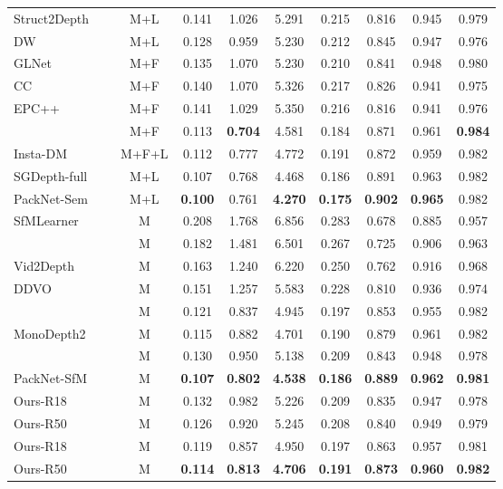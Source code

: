 \documentclass[twocolumn]{svjour3}
\renewcommand{\cite}[1]{\textcolor{blue}{\citep{#1}}}
\begin{document}
\begin{table*}[t]
\begin{tabular}{l c c| c c c c | c c c}
     Struct2Depth~\cite{casser2019struct2depth} &  & M+L & 0.141 & 1.026 & 5.291 & 0.215 & 0.816 & 0.945 & 0.979 \\
     DW\cite{gordon2019depth} &  & M+L & 0.128 & 0.959 & 5.230 & 0.212 & 0.845 & 0.947 & 0.976 \\
     GLNet\cite{chen2019self} &  & M+F & 0.135 & 1.070 & 5.230 & 0.210 & 0.841 & 0.948 & 0.980 \\
     CC~\cite{ranjan2019cc} &  & M+F & 0.140 & 1.070 & 5.326  & 0.217 & 0.826 & 0.941 & 0.975 \\
     EPC++~\cite{luo2019every} &  &M+F & 0.141 & 1.029 & 5.350 & 0.216 & 0.816 & 0.941 & 0.976 \\
     \cite{zhao2020towards} &  &M+F & 0.113 & \textbf{0.704} & 4.581 & 0.184 & 0.871 & 0.961 & \textbf{0.984} \\
     Insta-DM~\cite{lee2021learning} &  & M+F+L & 0.112	& 0.777	& 4.772	& 0.191	& 0.872	& 0.959	& 0.982 \\
     SGDepth-full~\cite{klingner2020self} &  & M+L & 0.107 & 0.768 & 4.468 & 0.186 & 0.891 & 0.963 & 0.982 \\
     PackNet-Sem~\cite{packnet-semguided} &  & M+L & \textbf{0.100} & 0.761 & \textbf{4.270} & \textbf{0.175} & \textbf{0.902} & \textbf{0.965} & 0.982 \\
     \hline
     SfMLearner~\cite{zhou2017unsupervised} &  & M & 0.208 & 1.768 & 6.856 & 0.283 & 0.678 & 0.885 & 0.957 \\
     \cite{yang2018unsupervised} &  & M & 0.182 & 1.481 & 6.501 & 0.267 & 0.725 & 0.906 & 0.963 \\
     Vid2Depth~\cite{mahjourian2018unsupervised} &  & M & 0.163 & 1.240 & 6.220 & 0.250 & 0.762 & 0.916 & 0.968 \\
     DDVO~\cite{Wang2018CVPR} &  & M & 0.151 & 1.257 & 5.583 & 0.228 & 0.810 & 0.936 & 0.974 \\
     \cite{Zhou_2019_ICCV} &  & M & 0.121 & 0.837 & 4.945  & 0.197 & 0.853 & 0.955 & 0.982 \\
     MonoDepth2~\cite{monodepth2} &  & M & 0.115 & 0.882 & 4.701 & 0.190 & 0.879 & 0.961 & 0.982 \\
     \cite{li2020unsupervised} &  & M & 0.130 & 0.950 & 5.138 & 0.209 & 0.843 & 0.948 & 0.978 \\
     PackNet-SfM~\cite{packnet} &  & M & \textbf{0.107} & \textbf{0.802} & \textbf{4.538} & \textbf{0.186} & \textbf{0.889} & \textbf{0.962} & \textbf{0.981} \\
     \hline
     Ours-R18 &  & M &   0.132  &   0.982  &   5.226  &   0.209  &   0.835  &   0.947  &   0.978  \\
     Ours-R50 &  & M &   0.126  &   0.920  &   5.245  &   0.208  &   0.840  &   0.949  &   0.979  \\ 
     Ours-R18 &  & M &   0.119  &   0.857  &   4.950  &   0.197  &   0.863  &   0.957  &   0.981  \\
     Ours-R50 &  & M &  \textbf{0.114} & \textbf{0.813} & \textbf{4.706} & \textbf{0.191} & \textbf{0.873} & \textbf{0.960} & \textbf{0.982} \\
     \hline
  \end{tabular}
\end{table*}
\end{document}
